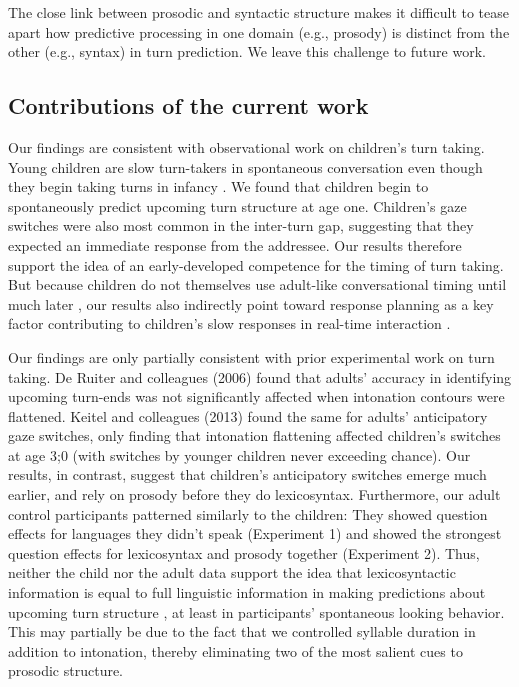 \documentclass[authoryear, 12pt]{elsarticle}
\begin{document}
The close link between prosodic and syntactic structure makes it difficult to tease apart how predictive processing in one domain (e.g., prosody) is distinct from the other (e.g., syntax) in turn prediction. We leave this challenge to future work.

\subsection{Contributions of the current work}

Our findings are consistent with observational work on children's turn taking. Young children are slow turn-takers in spontaneous conversation \citep{casillasUndRev} even though they begin taking turns in infancy \citep{hilbrinkInPrep, jaffe2001}. We found that children begin to spontaneously predict upcoming turn structure at age one. Children's gaze switches were also most common in the inter-turn gap, suggesting that they expected an immediate response from the addressee. Our results therefore support the idea of an early-developed competence for the timing of turn taking. But because children do not themselves use adult-like conversational timing until much later \citep[age six; ][]{ervin-tripp1979}, our results also indirectly point toward response planning as a key factor contributing to children's slow responses in real-time interaction \citep{casillasUndRev}.

Our findings are only partially consistent with prior experimental work on turn taking. De Ruiter and colleagues (2006) found that adults' accuracy in identifying upcoming turn-ends was not significantly affected when intonation contours were flattened. Keitel and colleagues (2013) found the same for adults' anticipatory gaze switches, only finding that intonation flattening affected children's switches at age 3;0 (with switches by younger children never exceeding chance). Our results, in contrast, suggest that children's anticipatory switches emerge much earlier, and rely on prosody before they do lexicosyntax. Furthermore, our adult control participants patterned similarly to the children: They showed question effects for languages they didn't speak (Experiment 1) and showed the strongest question effects for lexicosyntax and prosody together (Experiment 2). Thus, neither the child nor the adult data support the idea that lexicosyntactic information is equal to full linguistic information in making predictions about upcoming turn structure \citep{de-ruiter2006}, at least in participants' spontaneous looking behavior. This may partially be due to the fact that we controlled syllable duration in addition to intonation, thereby eliminating two of the most salient cues to prosodic structure. 
\end{document}
